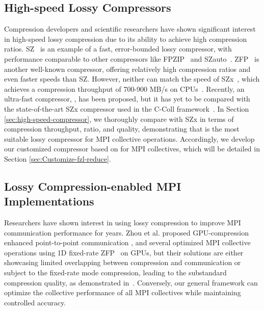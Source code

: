 \subsection{High-speed Lossy Compressors}

Compression developers and scientific researchers have shown significant interest in high-speed lossy compression due to its ability to achieve high compression ratios. SZ~\cite{Di2016SZ, Tao2017SZ, Liang2018SZ} is an example of a fast, error-bounded lossy compressor, with performance comparable to other compressors like FPZIP~\cite{Lindstrom2006FPZIP} and SZauto~\cite{Zhao2020SZauto}. ZFP~\cite{Lindstrom2014ZFP} is another well-known compressor, offering relatively high compression ratios and even faster speeds than SZ. However, neither can match the speed of SZx~\cite{Yu2022SZx}, which achieves a compression throughput of 700-900 MB/s on CPUs~\cite{Yu2022SZx}. Recently, an ultra-fast compressor, {\fzlight}, has been proposed, but it has yet to be compared with the state-of-the-art SZx compressor used in the C-Coll framework~\cite{huang2023ccoll}. In Section \ref{sec:high-speed-compressor}, we thoroughly compare {\fzlight} with SZx in terms of compression throughput, ratio, and quality, demonstrating that {\fzlight} is the most suitable lossy compressor for MPI collective operations. Accordingly, we develop our customized compressor based on {\fzlight} for MPI collectives, which will be detailed in Section \ref{sec:Customize-fzl-reduce}.




\subsection{Lossy Compression-enabled MPI Implementations}
Researchers have shown interest in using lossy compression to improve MPI communication performance for years. Zhou et al. proposed GPU-compression enhanced point-to-point communication \cite{Zhou2021GPUCOMPRESSION}, and several optimized MPI collective operations \cite{Zhou2022GPUCOMPRESSIONALLTOALL, Zhou2022HiPC} using 1D fixed-rate ZFP~\cite{Lindstrom2014ZFP} on GPUs, but their solutions are either showcasing limited overlapping between compression and communication or subject to the fixed-rate mode compression, leading to the substandard compression quality, as demonstrated in~\cite{huang2023ccoll}. Conversely, our general framework can optimize the collective performance of all MPI collectives while maintaining controlled accuracy.


